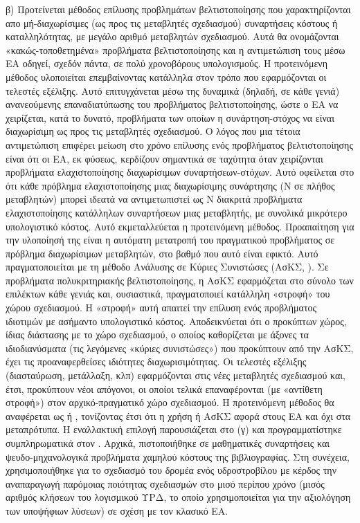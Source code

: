 	β)  Προτείνεται μέθοδος επίλυσης προβλημάτων βελτιστοποίησης που χαρακτηρίζονται απο μή-διαχωρίσιμες (ως προς τις μεταβλητές σχεδιασμού) συναρτήσεις κόστους ή καταλληλότητας, με μεγάλο αριθμό μεταβλητών σχεδιασμού. Αυτά θα ονομάζονται «κακώς-τοποθετημένα» προβλήματα βελτιστοποίησης και η αντιμετώπιση τους μέσω ΕΑ οδηγεί, σχεδόν πάντα, σε πολύ χρονοβόρους υπολογισμούς. Η προτεινόμενη μέθοδος υλοποιείται επεμβαίνοντας κατάλληλα στον τρόπο που εφαρμόζονται οι τελεστές εξέλιξης.  Αυτό επιτυγχάνεται μέσω της δυναμικά (δηλαδή, σε κάθε γενιά) ανανεούμενης επαναδιατύπωσης του προβλήματος βελτιστοποίησης, ώστε ο ΕΑ να χειρίζεται, κατά το δυνατό, προβλήματα των οποίων η συνάρτηση-στόχος να είναι διαχωρίσιμη ως προς τις μεταβλητές σχεδιασμού. Ο λόγος που μια τέτοια αντιμετώπιση επιφέρει μείωση στο χρόνο επίλυσης ενός προβλήματος βελτιστοποίησης είναι ότι οι ΕΑ, εκ φύσεως, κερδίζουν σημαντικά σε ταχύτητα όταν χειρίζονται προβλήματα ελαχιστοποίησης διαχωρίσιμων συναρτήσεων-στόχων. Αυτό οφείλεται στο ότι κάθε πρόβλημα ελαχιστοποίησης μιας διαχωρίσιμης συνάρτησης (Ν σε πλήθος μεταβλητών) μπορεί ιδεατά να αντιμετωπιστεί ως Ν διακριτά προβλήματα ελαχιστοποίησης κατάλληλων συναρτήσεων μιας μεταβλητής, με συνολικά μικρότερο υπολογιστικό κόστος.  Αυτό εκμεταλλεύεται η προτεινόμενη μέθοδος. Προαπαίτηση για την υλοποίησή της είναι η αυτόματη μετατροπή του πραγματικού προβλήματος σε πρόβλημα διαχωρίσιμων μεταβλητών, στο βαθμό που αυτό είναι εφικτό. Αυτό πραγματοποιείται με τη μέθοδο Ανάλυσης σε Κύριες Συνιστώσες \cite{Haykin,Jolliffe_2002} (ΑσΚΣ, ). Σε προβλήματα πολυκριτηριακής βελτιστοποίησης, η ΑσΚΣ εφαρμόζεται στο σύνολο των επιλέκτων κάθε γενιάς και, ουσιαστικά, πραγματοποιεί κατάλληλη «στροφή» του χώρου σχεδιασμού. Η «στροφή» αυτή απαιτεί την επίλυση ενός προβλήματος ιδιοτιμών με ασήμαντο υπολογιστικό κόστος. Αποδεικνύεται ότι ο προκύπτων χώρος, ίδιας διάστασης με το χώρο σχεδιασμού, ο οποίος καθορίζεται με άξονες τα ιδιοδιανύσματα (τις λεγόμενες «κύριες συνιστώσες») που προκύπτουν από την ΑσΚΣ, έχει τις προαναφερθείσες ιδιότητες διαχωρισιμότητας. Οι τελεστές εξέλιξης (διασταύρωση, μετάλλαξη, κλπ) εφαρμόζονται στις νέες μεταβλητές σχεδιασμού και, έτσι, προκύπτουν νέοι απόγονοι, οι οποίοι τελικά επαναφέρονται (με «αντίθετη στροφή») στον αρχικό-πραγματικό χώρο σχεδιασμού. Η προτεινόμενη μέθοδος θα αναφέρεται ως  ή , τονίζοντας έτσι ότι η χρήση  ή ΑσΚΣ αφορά στους ΕΑ και όχι στα μεταπρότυπα. Η εναλλακτική επιλογή παρουσιάζεται στο (γ) και προγραμματίστηκε συμπληρωματικά στον . Αρχικά, πιστοποιήθηκε σε μαθηματικές συναρτήσεις και ψευδο-μηχανολογικά προβλήματα χαμηλού κόστους της βιβλιογραφίας. Στη συνέχεια, χρησιμοποιήθηκε για το σχεδιασμό του δρομέα ενός υδροστροβίλου   με κέρδος την αναπαραγωγή παρόμοιας ποιότητας σχεδιασμών στο μισό περίπου χρόνο (μισός αριθμός κλήσεων του λογισμικού ΥΡΔ, το οποίο χρησιμοποιείται για την αξιολόγηση των υποψήφιων λύσεων) σε σχέση με τον κλασικό EA.  
 
